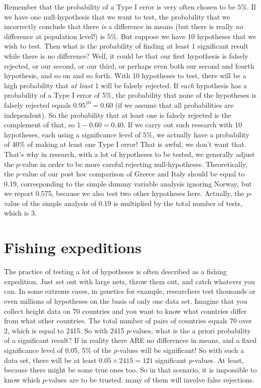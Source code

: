 Remember that the probability of a Type I error is very often chosen to be $5\%$. If we have one null-hypothesis that we want to test, the probability that we incorrectly conclude that there \textit{is} a difference in means (but there is really \textit{no} difference at population level!) is $5\%$. But suppose we have 10 hypotheses that we wish to test. Then what is the probability of finding at least 1 significant result while there is no difference? Well, it could be that our first hypothesis is falsely rejected, or our second, or our third, or perhaps even both our second and fourth hypothesis, and so on and so forth. With 10 hypotheses to test, there will be a high probability that \textit{at least} 1 will be falsely rejected. If \textit{each} hypothesis has a probability of a Type I error of 5\%, the probability that none of the hypotheses is falsely rejected equals $0.95^{10}=0.60$ (if we assume that all probabilities are independent). So the probability that at least one is falsely rejected is the complement of that, so $1-0.60=0.40$. If we carry out such research with 10 hypotheses, each using a significance level of $5\%$, we actually have a probability of 40\% of making at least one Type I error! That is awful, we don't want that. That's why in research, with a lot of hypotheses to be tested, we generally adjust the $p$-value in order to be more careful rejecting null-hypotheses. Theoretically, the $p$-value of our post hoc comparison of Greece and Italy should be equal to 0.19, corresponding to the simple dummy variable analysis ignoring Norway, but we report 0.575, because we also test two other hypotheses here. Actually, the $p$-value of the simple analysis of 0.19 is multiplied by the total number of tests, which is 3.





\section{Fishing expeditions}
The practice of testing a lot of hypotheses is often described as a fishing expedition. Just set out with large nets, throw them out, and catch whatever you can. In some extreme cases, in genetics for example, researchers test thousands or even millions of hypotheses on the basis of only one data set. Imagine that you collect height data on 70 countries and you want to know what countries differ from what other countries. The total number of pairs of countries equals 70 over 2, which is equal to 2415. So with 2415 $p$-values, what is the a priori probability of a significant result? If in reality there ARE no differences in means, and a fixed significance level of 0.05, 5\% of the $p$-values will be significant! So with such a data set, there will be at least $0.05 \times 2415 = 121$ significant $p$-values. At least, because there might be some true ones too. So in that scenario, it is impossible to know which $p$-values are to be trusted: many of them will involve false rejections.

